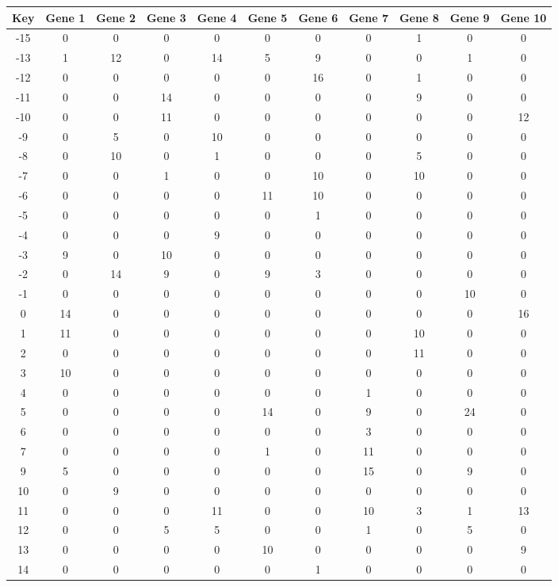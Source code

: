 \begin{tabular}{|c|c|c|c|c|c|c|c|c|c|c|}
\hline
Key & Gene 1 & Gene 2 & Gene 3 & Gene 4 & Gene 5 & Gene 6 & Gene 7 & Gene 8 & Gene 9 & Gene 10 \\
\hline
-15 & 0 & 0 & 0 & 0 & 0 & 0 & 0 & 1 & 0 & 0 \\
-13 & 1 & 12 & 0 & 14 & 5 & 9 & 0 & 0 & 1 & 0 \\
-12 & 0 & 0 & 0 & 0 & 0 & 16 & 0 & 1 & 0 & 0 \\
-11 & 0 & 0 & 14 & 0 & 0 & 0 & 0 & 9 & 0 & 0 \\
-10 & 0 & 0 & 11 & 0 & 0 & 0 & 0 & 0 & 0 & 12 \\
-9 & 0 & 5 & 0 & 10 & 0 & 0 & 0 & 0 & 0 & 0 \\
-8 & 0 & 10 & 0 & 1 & 0 & 0 & 0 & 5 & 0 & 0 \\
-7 & 0 & 0 & 1 & 0 & 0 & 10 & 0 & 10 & 0 & 0 \\
-6 & 0 & 0 & 0 & 0 & 11 & 10 & 0 & 0 & 0 & 0 \\
-5 & 0 & 0 & 0 & 0 & 0 & 1 & 0 & 0 & 0 & 0 \\
-4 & 0 & 0 & 0 & 9 & 0 & 0 & 0 & 0 & 0 & 0 \\
-3 & 9 & 0 & 10 & 0 & 0 & 0 & 0 & 0 & 0 & 0 \\
-2 & 0 & 14 & 9 & 0 & 9 & 3 & 0 & 0 & 0 & 0 \\
-1 & 0 & 0 & 0 & 0 & 0 & 0 & 0 & 0 & 10 & 0 \\
0 & 14 & 0 & 0 & 0 & 0 & 0 & 0 & 0 & 0 & 16 \\
1 & 11 & 0 & 0 & 0 & 0 & 0 & 0 & 10 & 0 & 0 \\
2 & 0 & 0 & 0 & 0 & 0 & 0 & 0 & 11 & 0 & 0 \\
3 & 10 & 0 & 0 & 0 & 0 & 0 & 0 & 0 & 0 & 0 \\
4 & 0 & 0 & 0 & 0 & 0 & 0 & 1 & 0 & 0 & 0 \\
5 & 0 & 0 & 0 & 0 & 14 & 0 & 9 & 0 & 24 & 0 \\
6 & 0 & 0 & 0 & 0 & 0 & 0 & 3 & 0 & 0 & 0 \\
7 & 0 & 0 & 0 & 0 & 1 & 0 & 11 & 0 & 0 & 0 \\
9 & 5 & 0 & 0 & 0 & 0 & 0 & 15 & 0 & 9 & 0 \\
10 & 0 & 9 & 0 & 0 & 0 & 0 & 0 & 0 & 0 & 0 \\
11 & 0 & 0 & 0 & 11 & 0 & 0 & 10 & 3 & 1 & 13 \\
12 & 0 & 0 & 5 & 5 & 0 & 0 & 1 & 0 & 5 & 0 \\
13 & 0 & 0 & 0 & 0 & 10 & 0 & 0 & 0 & 0 & 9 \\
14 & 0 & 0 & 0 & 0 & 0 & 1 & 0 & 0 & 0 & 0 \\
\hline
\end{tabular}